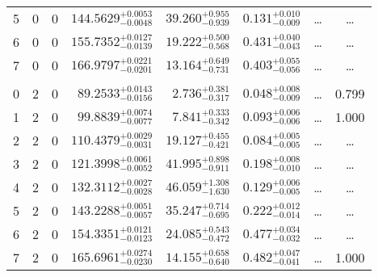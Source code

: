 \begin{table*}[!]
\begin{tabular}{llcrrlrc}
5 & 0 & 0 & $    144.5629_{-      0.0048}^{+      0.0053}$ & $      39.260_{-       0.939}^{+       0.955}$ & $       0.131_{-       0.009}^{+       0.010}$ & \multicolumn{1}{c}{\dots} & \dots \\[1pt]
6 & 0 & 0 & $    155.7352_{-      0.0139}^{+      0.0127}$ & $      19.222_{-       0.568}^{+       0.500}$ & $       0.431_{-       0.043}^{+       0.040}$ & \multicolumn{1}{c}{\dots} & \dots \\[1pt]
7 & 0 & 0 & $    166.9797_{-      0.0201}^{+      0.0221}$ & $      13.164_{-       0.731}^{+       0.649}$ & $       0.403_{-       0.056}^{+       0.055}$ & \multicolumn{1}{c}{\dots} & \dots \\[1pt]
\hline \\[-8pt]
0 & 2 & 0 & $     89.2533_{-      0.0156}^{+      0.0143}$ & $       2.736_{-       0.317}^{+       0.381}$ & $       0.048_{-       0.009}^{+       0.008}$ & \multicolumn{1}{c}{\dots} & 0.799\\[1pt]
1 & 2 & 0 & $     99.8839_{-      0.0077}^{+      0.0074}$ & $       7.841_{-       0.342}^{+       0.333}$ & $       0.093_{-       0.006}^{+       0.006}$ & \multicolumn{1}{c}{\dots} & 1.000\\[1pt]
2 & 2 & 0 & $    110.4379_{-      0.0031}^{+      0.0029}$ & $      19.127_{-       0.421}^{+       0.455}$ & $       0.084_{-       0.005}^{+       0.005}$ & \multicolumn{1}{c}{\dots} & \dots \\[1pt]
3 & 2 & 0 & $    121.3998_{-      0.0052}^{+      0.0061}$ & $      41.995_{-       0.911}^{+       0.898}$ & $       0.198_{-       0.010}^{+       0.008}$ & \multicolumn{1}{c}{\dots} & \dots \\[1pt]
4 & 2 & 0 & $    132.3112_{-      0.0028}^{+      0.0027}$ & $      46.059_{-       1.630}^{+       1.308}$ & $       0.129_{-       0.005}^{+       0.006}$ & \multicolumn{1}{c}{\dots} & \dots \\[1pt]
5 & 2 & 0 & $    143.2288_{-      0.0057}^{+      0.0051}$ & $      35.247_{-       0.695}^{+       0.714}$ & $       0.222_{-       0.014}^{+       0.012}$ & \multicolumn{1}{c}{\dots} & \dots \\[1pt]
6 & 2 & 0 & $    154.3351_{-      0.0123}^{+      0.0121}$ & $      24.085_{-       0.472}^{+       0.543}$ & $       0.477_{-       0.032}^{+       0.034}$ & \multicolumn{1}{c}{\dots} & \dots \\[1pt]
7 & 2 & 0 & $    165.6961_{-      0.0230}^{+      0.0274}$ & $      14.155_{-       0.640}^{+       0.658}$ & $       0.482_{-       0.041}^{+       0.047}$ & \multicolumn{1}{c}{\dots} & 1.000\\[1pt]

\end{tabular}
\end{table*}

